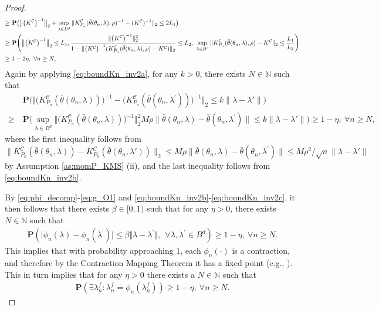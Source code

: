 \documentclass[letterpaper,11pt]{article}
\theoremstyle{myplain}
\theoremstyle{mydefinition}
\theoremstyle{myremark}
\renewcommand{\cite}{\citet}
\newcommand{\N}{\mathbb{N}}
\newcommand{\cC}{\mathcal{C}}
\numberwithin{equation}{section}
\numberwithin{figure}{section}
\begin{document}
\begin{appendices}
\begin{proof}
\begin{align}
\ge&~ \mathbf P\big(\big\Vert \big(K^{\cC} \big)^{-1} \big\Vert_2+\sup_{\lambda\in B^d}\|K_{P_{n}}^{\cC}(\bar\theta(\theta_{n},\lambda),\rho )^{-1}-(K^{\cC})^{-1}\|_2 \le 2L_1 \big)\notag	\\
\ge &~\mathbf P\Bigg(\big\Vert \big(K^{\cC} \big)^{-1} \big\Vert_2\le L_1 , \frac{\Vert \big( K^{\cC}\big)^{-1}\Vert_2^2}{1-\|\big( K^{\cC}\big)^{-1}(K_{P_{n}}^{\cC}(\bar\theta(\theta_{n},\lambda),\rho )-K^{\cC})\|_2}\le L_2,~\sup_{\lambda\in B^d}\|K_{P_{n}}^{\cC}(\bar\theta(\theta_{n},\lambda),\rho )-K^{\cC}\|_2 \le \frac{L_1}{L_2} \Bigg)\notag\\
\ge & ~ 1-2\eta,~\forall n\ge N,	\label{eq:boundKn_inv2b}
\end{align}
Again by applying \eqref{eq:boundKn_inv2a}, for any $k>0$, there exists $N\in\mathbb N$ such that
\begin{align}
	&~\mathbf P\big(\big\Vert \big(K_{P_{n}}^{\cC}(\bar\theta(\theta_{n},\lambda))\big)^{-1}- \big(K_{P_{n}}^{\cC}(\bar\theta(\theta_{n},\lambda^\prime))\big)^{-1}\big\Vert_2\le k\|\lambda-\lambda'\|\big)
	\\
	\ge&~ \mathbf P\Big(\sup_{\lambda\in B^d}\big\Vert \big(K_{P_{n}}^{\cC}(\bar\theta(\theta_{n},\lambda)) \big)^{-1} \big\Vert_2^2 M \rho \|\bar\theta(\theta_{n},\lambda)-\bar\theta(\theta_{n},\lambda^\prime)\|\le k\|\lambda-\lambda'\| \Big)\ge 1-\eta,~\forall n\ge N,\label{eq:boundKn_inv2c}
\end{align}
where the first inequality follows from $\|K_{P_{n}}^{\cC}(\bar\theta(\theta_{n},\lambda))-K_{P_{n}}^{\cC}(\bar\theta(\theta_{n},\lambda'))\|_2\le M\rho \|\bar\theta(\theta_{n},\lambda)-\bar\theta(\theta_{n},\lambda^\prime)\|\le M\rho ^2/\sqrt n\|\lambda-\lambda'\|$ by Assumption \ref{as:momP_KMS} (ii), and the last inequality follows from \eqref{eq:boundKn_inv2b}.

By \eqref{eq:phi_decomp}-\eqref{eq:g_O1} and \eqref{eq:boundKn_inv2b}-\eqref{eq:boundKn_inv2c}, it then follows that
 there exists $\beta \in [0,1)$ such that for any $\eta>0$, there exists $N \in \N$ such that
\begin{align}
\mathbf{P}\left(\vert \phi_{n}(\lambda) - \phi_{n}(\lambda^\prime) \vert \le \beta \Vert \lambda - \lambda^\prime \Vert, ~~\forall \lambda,\lambda^\prime \in B^d\right) \ge 1-\eta, ~\forall n\ge N. \label{eq:contraction}
\end{align}
This implies that with probability approaching 1, each $\phi_{n}(\cdot)$ is a contraction, and therefore by the Contraction Mapping Theorem it has a fixed point (e.g., \cite[Theorem 1.3]{Pata}). This in turn implies that for any $\eta>0$ there exists a $N \in \N$ such that
\begin{align}
\mathbf{P}\left(\exists \lambda^f_{n}: \lambda^f_{n} = \phi_{n}(\lambda^f_{n})  \right) \ge 1-\eta, ~\forall n\ge N. \label{eq:fixed_point}
\end{align}



\end{proof}
\end{appendices}
\end{document}

